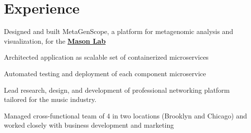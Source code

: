 \documentclass[letterpaper]{deedy-resume} %
\begin{document}
\begin{minipage}[t]{0.66\textwidth} %


\section{Experience}


\vspace{\topsep} %
\begin{tightitemize}
  \item Designed and built MetaGenScope, a platform for metagenomic analysis and visualization, for the \href{http://masonlab.net}{\textbf{Mason Lab}}
  \item Architected application as scalable set of containerized microservices
  \item Automated testing and deployment of each component microservice
\end{tightitemize}

\sectionspace %



\begin{tightitemize}
  \item Lead research, design, and development of professional networking platform tailored for the music industry.
  \item Managed cross-functional team of 4 in two locations (Brooklyn and Chicago) and worked closely with business development and marketing
\end{tightitemize}

\sectionspace %



\end{minipage}
\end{document}
